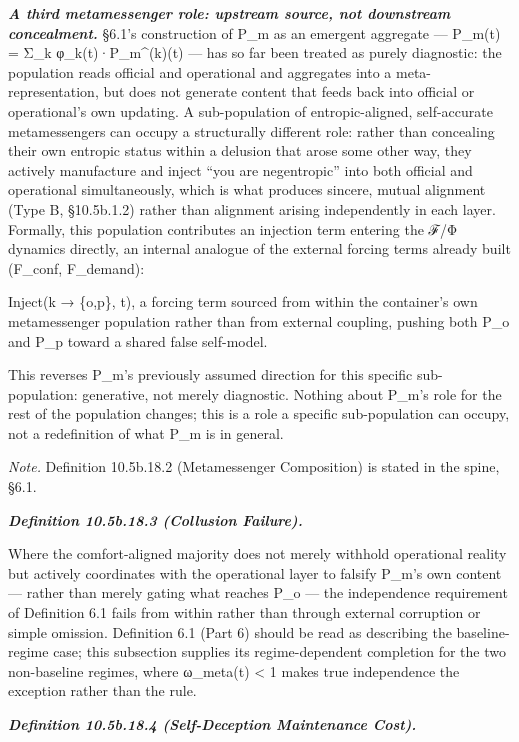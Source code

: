 \documentclass[
]{article}
\begin{document}
\emph{\textbf{A third metamessenger role: upstream source, not
downstream concealment.}} §6.1's construction of P\_m as an emergent
aggregate --- P\_m(t) = Σ\_k φ\_k(t)·P\_m\^{}(k)(t) --- has so far been
treated as purely diagnostic: the population reads official and
operational and aggregates into a meta-representation, but does not
generate content that feeds back into official or operational's own
updating. A sub-population of entropic-aligned, self-accurate
metamessengers can occupy a structurally different role: rather than
concealing their own entropic status within a delusion that arose some
other way, they actively manufacture and inject ``you are negentropic''
into both official and operational simultaneously, which is what
produces sincere, mutual alignment (Type B, §10.5b.1.2) rather than
alignment arising independently in each layer. Formally, this population
contributes an injection term entering the ℱ/Φ dynamics directly, an
internal analogue of the external forcing terms already built (F\_conf,
F\_demand):

Inject(k → \{o,p\}, t), a forcing term sourced from within the
container's own metamessenger population rather than from external
coupling, pushing both P\_o and P\_p toward a shared false self-model.

This reverses P\_m's previously assumed direction for this specific
sub-population: generative, not merely diagnostic. Nothing about P\_m's
role for the rest of the population changes; this is a role a specific
sub-population can occupy, not a redefinition of what P\_m is in
general.

\emph{Note.} Definition 10.5b.18.2 (Metamessenger Composition) is stated
in the spine, §6.1.

\emph{\textbf{Definition 10.5b.18.3 (Collusion Failure).}}

Where the comfort-aligned majority does not merely withhold operational
reality but actively coordinates with the operational layer to falsify
P\_m's own content --- rather than merely gating what reaches P\_o ---
the independence requirement of Definition 6.1 fails from within rather
than through external corruption or simple omission. Definition 6.1
(Part 6) should be read as describing the baseline-regime case; this
subsection supplies its regime-dependent completion for the two
non-baseline regimes, where ω\_meta(t) \textless{} 1 makes true
independence the exception rather than the rule.

\emph{\textbf{Definition 10.5b.18.4 (Self-Deception Maintenance Cost).}}
\end{document}
